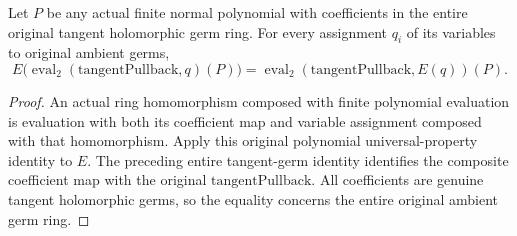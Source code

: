 \begin{theorem}
\label{hir:actual-normal-unit-tangent-coefficient-evaluation}
Let $P$ be any actual finite normal polynomial with coefficients in the
entire original tangent holomorphic germ ring. For every assignment
$q_i$ of its variables to original ambient germs,
\[
 E\bigl(\operatorname{eval}_2(\mathrm{tangentPullback},q)(P)\bigr)
 =\operatorname{eval}_2(\mathrm{tangentPullback},E(q))(P).
\]
\leanok
\end{theorem}
\begin{proof}
An actual ring homomorphism composed with finite polynomial evaluation
is evaluation with both its coefficient map and variable assignment
composed with that homomorphism. Apply this original polynomial
universal-property identity to $E$. The preceding entire tangent-germ
identity identifies the composite coefficient map with the original
$\mathrm{tangentPullback}$. All coefficients are genuine tangent
holomorphic germs, so the equality concerns the entire original
ambient germ ring.
\end{proof}

